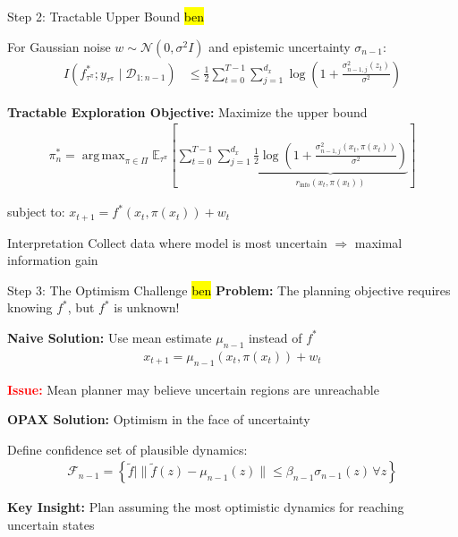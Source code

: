 \documentclass[11pt,aspectratio=169]{beamer}
\DeclareMathOperator*{\argmax}{arg\,max}
\begin{document}
\begin{frame}{Step 2: Tractable Upper Bound \hl{ben}}
    \begin{lemma}
        For Gaussian noise $w \sim \mathcal{N}(0, \sigma^2 I)$ and epistemic uncertainty $\sigma_{n-1}$:
        \begin{align}
            I\left(f^*_{\tau^\pi}; y_{\tau^\pi} \mid \mathcal{D}_{1:n-1}\right) &\leq \frac{1}{2} \sum_{t=0}^{T-1} \sum_{j=1}^{d_x} \log \left(1 + \frac{\sigma_{n-1, j}^2(z_t)}{\sigma^2}\right)
        \end{align}
    \end{lemma}
    
    \vspace{0.5em}
    \textbf{Tractable Exploration Objective:} Maximize the upper bound
    \begin{align}
        \pi_n^* = \argmax_{\pi \in \Pi} \mathbb{E}_{\tau^\pi}\left[\sum_{t=0}^{T-1} \sum_{j=1}^{d_x} \underbrace{\frac{1}{2}\log \left(1 + \frac{\sigma_{n-1, j}^2(x_t, \pi(x_t))}{\sigma^2}\right)}_{r_{\text{info}}(x_t, \pi(x_t))}\right]
    \end{align}
    
    subject to: $x_{t+1} = f^*(x_t, \pi(x_t)) + w_t$
    
    \begin{block}{Interpretation}
        Collect data where model is most uncertain $\Rightarrow$ maximal information gain
    \end{block}
\end{frame}

\begin{frame}{Step 3: The Optimism Challenge \hl{ben}}
    \textbf{Problem:} The planning objective requires knowing $f^*$, but $f^*$ is unknown!
    
    \vspace{0.5em}
    \textbf{Naive Solution:} Use mean estimate $\mu_{n-1}$ instead of $f^*$
    \begin{align}
        x_{t+1} = \mu_{n-1}(x_t, \pi(x_t)) + w_t
    \end{align}
    
    \textcolor{red}{\textbf{Issue:}} Mean planner may believe uncertain regions are unreachable
    
    \vspace{0.5em}
    \textbf{OPAX Solution:} \alert{Optimism in the face of uncertainty}
    
    Define confidence set of plausible dynamics:
    \begin{align}
        \mathcal{F}_{n-1} = \left\{ \tilde{f} \mid \|\tilde{f}(z) - \mu_{n-1}(z)\| \leq \beta_{n-1} \sigma_{n-1}(z) \,\forall z \right\}
    \end{align}
    
    \textbf{Key Insight:} Plan assuming the \alert{most optimistic} dynamics for reaching uncertain states
\end{frame}
\end{document}
